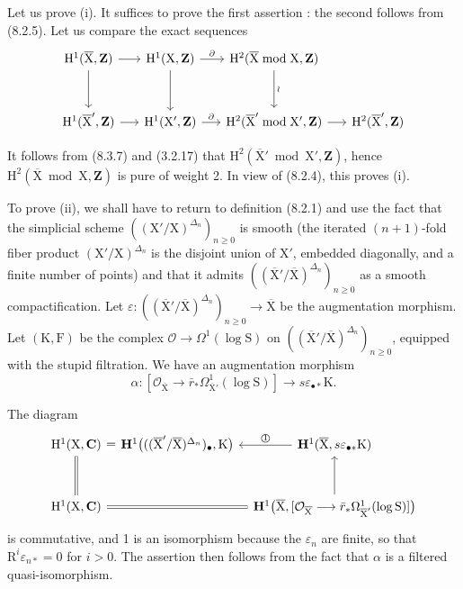 \documentclass[11pt,leqno]{article}
\begin{document}
Let us prove (i). It suffices to prove the first assertion : the second follows from (8.2.5). Let us compare the exact sequences
\[
\begin{tikzcd}[column sep=1.5em,row sep=3em]
\mathrm{H}^{1}(\overline{\mathrm{X}},\mathbf{Z})
 \arrow[r] \arrow[d]
&
\mathrm{H}^{1}(\mathrm{X},\mathbf{Z})
 \arrow[r,"\partial"] \arrow[d]
&
\mathrm{H}^{2}(\overline{\mathrm{X}}\bmod\mathrm{X},\mathbf{Z})
 \arrow[d,"\wr"]
&
\\
\mathrm{H}^{1}(\overline{\mathrm{X}}',\mathbf{Z})
 \arrow[r]
&
\mathrm{H}^{1}(\mathrm{X}',\mathbf{Z})
 \arrow[r,"\partial"]
&
\mathrm{H}^{2}(\overline{\mathrm{X}}'\bmod\mathrm{X}',\mathbf{Z})
 \arrow[r]
&
\mathrm{H}^{2}(\overline{\mathrm{X}}',\mathbf{Z})
\end{tikzcd}
\]

It follows from (8.3.7) and (3.2.17) that \(\mathrm{H}^{2}(\overline{\mathrm{X}}'\bmod\mathrm{X}',\mathbf{Z})\), hence \(\mathrm{H}^{2}(\overline{\mathrm{X}}\bmod\mathrm{X},\mathbf{Z})\) is pure of weight 2. In view of (8.2.4), this proves (i).

To prove (ii), we shall have to return to definition (8.2.1) and use the fact that the simplicial scheme \(((\mathrm{X}'/\mathrm{X})^{\Delta_n})_{n\geq0}\) is smooth (the iterated \((n+1)\)-fold fiber product \((\mathrm{X}'/\mathrm{X})^{\Delta_n}\) is the disjoint union of \(\mathrm{X}'\), embedded diagonally, and a finite number of points) and that it admits \(((\overline{\mathrm{X}}'/\overline{\mathrm{X}})^{\Delta_n})_{n\geq0}\) as a smooth compactification. Let \(\varepsilon:((\overline{\mathrm{X}}'/\overline{\mathrm{X}})^{\Delta_n})_{n\geq0}\to\overline{\mathrm{X}}\) be the augmentation morphism. Let \((\mathrm{K},\mathrm{F})\) be the complex \(\mathcal{O}\to\Omega^{1}(\log\mathrm{S})\) on \(((\overline{\mathrm{X}}'/\overline{\mathrm{X}})^{\Delta_n})_{n\geq0}\), equipped with the stupid filtration. We have an augmentation morphism
\[
\alpha:
[\mathcal{O}_{\overline{\mathrm{X}}}\to
 \bar r_*\Omega^{1}_{\overline{\mathrm{X}}'}(\log\mathrm{S})]
\longrightarrow s\varepsilon_{\bullet *}\mathrm{K}.
\]

The diagram
\[
\begin{tikzcd}[column sep=0.7em,row sep=3em]
\mathrm{H}^{1}(\mathrm{X},\mathbf{C})
 \arrow[r,phantom,"{\textstyle=}" description]
 \arrow[d,equal]
&
\mathbf{H}^{1}\bigl(
 ((\overline{\mathrm{X}}'/\overline{\mathrm{X}})^{\Delta_n})_{\bullet},
 \mathrm{K}\bigr)
&
\mathbf{H}^{1}(\overline{\mathrm{X}},s\varepsilon_{\bullet *}\mathrm{K})
 \arrow[l,"\text{\textcircled{1}}"']
\\
\mathrm{H}^{1}(\mathrm{X},\mathbf{C}) \arrow[rr,equal]
&&
\mathbf{H}^{1}\bigl(\overline{\mathrm{X}},
 [\mathcal{O}_{\overline{\mathrm{X}}}\longrightarrow
 \bar r_*\Omega^{1}_{\overline{\mathrm{X}}'}(\log\mathrm{S})]\bigr)
 \arrow[u]
\end{tikzcd}
\]
is commutative, and 1 is an isomorphism because the \(\varepsilon_n\) are finite, so that \(\mathrm{R}^{i}\varepsilon_{n*}=0\) for \(i>0\). The assertion then follows from the fact that \(\alpha\) is a filtered quasi-isomorphism.
\end{document}

